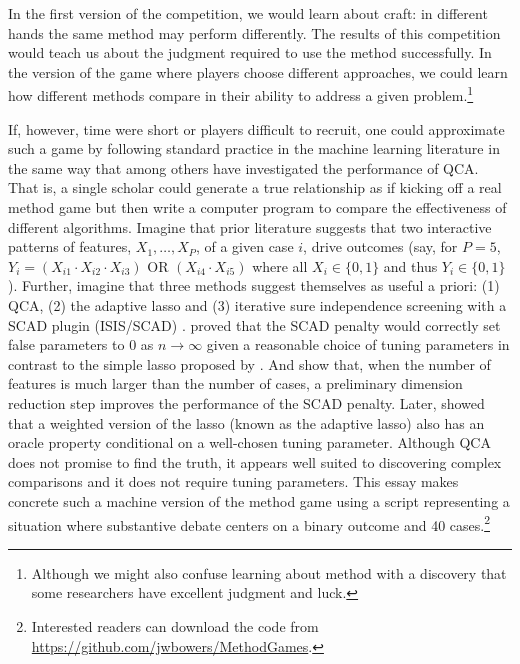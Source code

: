 \documentclass[12pt]{article}
\begin{document}
In the first version of the competition, we would learn about craft: in
different hands the same method may perform differently. The results of this
competition would teach us about the judgment required to use the method
successfully.  In the version of the game where players choose different
approaches, we could learn how different methods compare in their ability to
address a given problem.\footnote{Although we might also confuse learning
  about method with a discovery that some researchers have excellent judgment
  and luck.}

If, however, time were short or players difficult to recruit, one could
approximate such a game by following standard practice in the machine learning
literature in the same way that \cite{lucasfk2014} among others have
investigated the performance of QCA. That is, a single scholar could generate a true relationship as if
kicking off a real method game but then write a computer program to compare
the effectiveness of different algorithms. Imagine that prior literature
suggests that two interactive patterns of features, $X_1, \ldots, X_P$, of a
given case $i$, drive outcomes (say, for $P=5$, $Y_i= (X_{i1} \cdot X_{i2}
\cdot X_{i3} ) \text{ OR } ( X_{i4} \cdot X_{i5} )$ where all $X_i  \in
\{0,1\}$ and thus $Y_i \in \{0,1\}$).  Further, imagine that three methods
suggest themselves as useful a priori: (1) QCA, (2) the adaptive lasso and (3)
iterative sure independence screening with a SCAD plugin (ISIS/SCAD)
\citep{fan2008sure}.  \citet{fan2001variable} proved that the SCAD penalty
would correctly set false parameters to 0 as $n \rightarrow \infty$ given a
reasonable choice of tuning parameters in contrast to the simple lasso
proposed by \cite{tibshirani1996regression}.  And \citet{fan2008sure} show
that, when the number of features is much larger than the number of cases, a
preliminary dimension reduction step improves the performance of the SCAD
penalty.  Later, \citet{zou2006adaptive} showed that a weighted version of the
lasso (known as the adaptive lasso) also has an oracle property conditional on
a well-chosen tuning parameter. Although QCA does not promise to find the
truth, it appears well suited to discovering complex comparisons and it does
not require tuning parameters.  This essay makes concrete such a machine
version of the method game using a script representing a situation where
substantive debate centers on a binary outcome and 40
cases.\footnote{Interested readers can download the code from
  \url{https://github.com/jwbowers/MethodGames}.}
\end{document}
